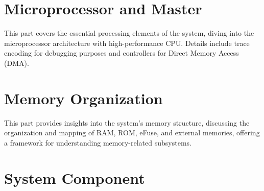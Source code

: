 \documentclass[openany, 10pt]{book}
\begin{document}
\setenglishformatting




\clearpage

\clearpage


\tableofcontents
\clearpage
\listoftables
\clearpage
\listoffigures





\part{Microprocessor and Master}


This part covers the essential processing elements of the system, diving into the microprocessor architecture with high-performance CPU. Details include trace encoding for debugging purposes and controllers for Direct Memory Access (DMA).



\part{Memory Organization}

This part provides insights into the system's memory structure, discussing the organization and mapping of RAM, ROM, eFuse, and external memories, offering a framework for understanding memory-related subsystems.


\part{System Component}
\end{document}
